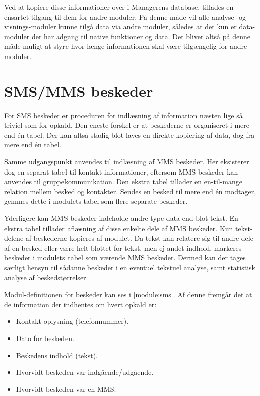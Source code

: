 Ved at kopiere disse informationer over i Managerens database, tillades en ensartet tilgang til dem for andre moduler.
På denne måde vil alle analyse- og visnings-moduler kunne tilgå data via andre moduler, således at det kun er data-moduler der har adgang til native funktioner og data.
Det bliver altså på denne måde muligt at styre hvor længe informationen skal være tilgængelig for andre moduler.



\section{SMS/MMS beskeder}\label{implementerede_moduler:smsmms}
For SMS beskeder er proceduren for indlæsning af information næsten lige så triviel som for opkald.
Den eneste forskel er at beskederne er organiseret i mere end én tabel.
Der kan altså stadig blot laves en direkte kopiering af data, dog fra mere end én tabel.

Samme udgangspunkt anvendes til indlæsning af MMS beskeder.
Her eksisterer dog en separat tabel til kontakt-informationer, eftersom MMS beskeder kan anvendes til gruppekommunikation.
Den ekstra tabel tillader en en-til-mange relation mellem besked og kontakter.
Sendes en besked til mere end én modtager, gemmes dette i modulets tabel som flere separate beskeder.

Yderligere kan MMS beskeder indeholde andre type data end blot tekst.
En ekstra tabel tillader aflæsning af disse enkelte dele af MMS beskeder.
Kun tekst-delene af beskederne kopieres af modulet.
Da tekst kan relatere sig til andre dele af en besked eller være helt blottet for tekst, men ej andet indhold, markeres beskeder i modulets tabel som værende MMS beskeder.
Dermed kan der tages særligt hensyn til sådanne beskeder i en eventuel tekstuel analyse, samt statistisk analyse af beskedstørrelser.

Modul-definitionen for beskeder kan ses i \cref{module:sms}.
Af denne fremgår det at de information der indhentes om hvert opkald er:
\begin{itemize}
\item Kontakt oplysning (telefonnummer).
\item Dato for beskeden.
\item Beskedens indhold (tekst).
\item Hvorvidt beskeden var indgående/udgående.
\item Hvorvidt beskeden var en MMS.
\end{itemize}


